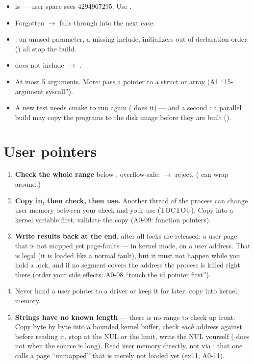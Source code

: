 \begin{trapbox}
\begin{itemize}
\item {} is  --- user space sees 4294967295. Use .
\item Forgotten  $\to$ falls through into the next case.
\item {}: an unused parameter, a missing include, initializers out of
  declaration order () all stop the build.
\item {} does not include  $\to$ .
\item At most 5 arguments. More: pass a pointer to a struct or array (A1 ``15-argument syscall'').
\item A new test  needs cmake to run again ( does it) --- and a
  second : a parallel build may copy the programs to the disk image before they
  are built ().
\end{itemize}
\end{trapbox}

\section{User pointers}
\label{sec:userptr}

\begin{enumerate}
\item \textbf{Check the whole range} below , overflow-safe:
   $\to$ reject. ( can wrap around.)
\item \textbf{Copy in, then check, then use.} Another thread of the process can change user
  memory between your check and your use (TOCTOU). Copy into a kernel variable first,
  validate the copy (A0-09: function pointers).
\item \textbf{Write results back at the end}, after all locks are released: a user page that
  is not mapped yet page-faults --- in kernel mode, on a user address. That is legal (it is
  loaded like a normal fault), but it must not happen while you hold a lock, and if no
  segment covers the address the process is killed right there (order your side effects:
  A0-08 ``touch the id pointer first'').
\item Never hand a user pointer to a driver or keep it for later: copy into kernel memory.
\item \textbf{Strings have no known length} --- there is no range to check up front. Copy byte by
  byte into a bounded kernel buffer, check \emph{each} address against  before
  reading it, stop at the NUL or the limit, write the NUL yourself ( does not when
  the source is long). Read user memory directly, not via : that one
  calls a page ``unmapped'' that is merely not loaded yet (ex11, A0-11).
\end{enumerate}

